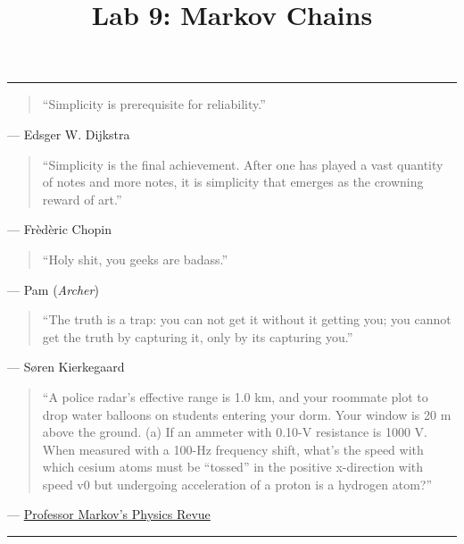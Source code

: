\documentclass[11pt]{cselabheader}
\title{Lab 9: Markov Chains}
\begin{document}
\maketitle

\hrule
\begin{quotation}
``Simplicity is prerequisite for reliability.''
\end{quotation}
\begin{flushright}
--- Edsger W. Dijkstra
\end{flushright}

\begin{quotation}
``Simplicity is the final achievement. After one has played a vast quantity of
notes and more notes, it is simplicity that emerges as the crowning reward of
art.''
\end{quotation}
\begin{flushright}
--- Fr\`ed\`eric Chopin
\end{flushright}

\begin{quotation}
``Holy shit, you geeks are badass.''
\end{quotation}
\begin{flushright}
  --- Pam (\emph{Archer})
\end{flushright}

\begin{quotation}
``The truth is a trap: you can not get it without it getting you; you cannot get
the truth by capturing it, only by its capturing you.''
\end{quotation}
\begin{flushright}
--- S{\o}ren Kierkegaard
\end{flushright}

\begin{quotation}
  ``A police radar’s effective range is 1.0 km, and your roommate plot to drop water balloons on students entering your dorm. Your window is 20 m above the ground. (a) If an ammeter with 0.10-V resistance is 1000 V. When measured with a 100-Hz frequency shift, what’s the speed with which cesium atoms must be “tossed” in the positive x-direction with speed v0 but undergoing acceleration of a proton is a hydrogen atom?''
\end{quotation}
\begin{flushright}
  --- \href{http://infohost.nmt.edu/~rkelly/physbot.html}{Professor Markov's Physics Revue}
\end{flushright}

\hrule
\end{document}
